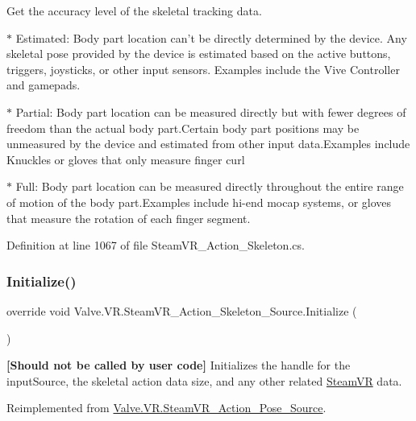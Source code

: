 Get the accuracy level of the skeletal tracking data. 

$\ast$ Estimated\+: Body part location can’t be directly determined by the device. Any skeletal pose provided by the device is estimated based on the active buttons, triggers, joysticks, or other input sensors. Examples include the Vive Controller and gamepads. 

$\ast$ Partial\+: Body part location can be measured directly but with fewer degrees of freedom than the actual body part.\+Certain body part positions may be unmeasured by the device and estimated from other input data.\+Examples include Knuckles or gloves that only measure finger curl 

$\ast$ Full\+: Body part location can be measured directly throughout the entire range of motion of the body part.\+Examples include hi-\/end mocap systems, or gloves that measure the rotation of each finger segment. 



Definition at line 1067 of file Steam\+V\+R\+\_\+\+Action\+\_\+\+Skeleton.\+cs.

\mbox{\label{class_valve_1_1_v_r_1_1_steam_v_r___action___skeleton___source_af437a90257ecb494eb2c0b77747fe9d4}} 
\subsubsection{\texorpdfstring{Initialize()}{Initialize()}}
{\footnotesize\ttfamily override void Valve.\+V\+R.\+Steam\+V\+R\+\_\+\+Action\+\_\+\+Skeleton\+\_\+\+Source.\+Initialize (\begin{DoxyParamCaption}{ }\end{DoxyParamCaption})\hspace{0.3cm}{\ttfamily [virtual]}}



{\bfseries{\mbox{[}Should not be called by user code\mbox{]}}} Initializes the handle for the input\+Source, the skeletal action data size, and any other related \mbox{\hyperlink{class_valve_1_1_v_r_1_1_steam_v_r}{Steam\+VR}} data. 



Reimplemented from \mbox{\hyperlink{class_valve_1_1_v_r_1_1_steam_v_r___action___pose___source_ab25a681f8310683a3c6695973041acc0}{Valve.\+V\+R.\+Steam\+V\+R\+\_\+\+Action\+\_\+\+Pose\+\_\+\+Source}}.



